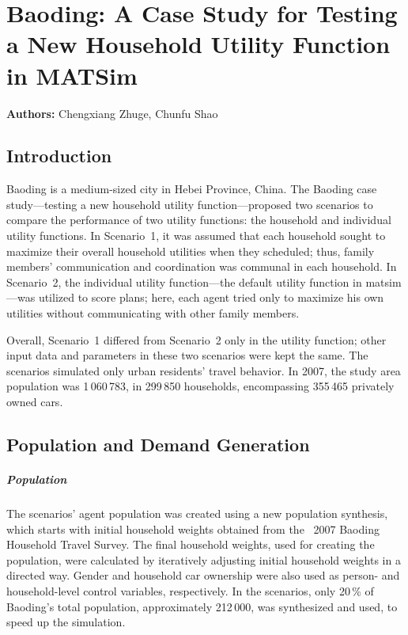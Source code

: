 \chapter{Baoding: A Case Study for Testing a New Household Utility Function in MATSim}
\label{ch:baoding}
\hfill \textbf{Authors:} Chengxiang Zhuge, Chunfu Shao



\section{Introduction}
Baoding is a medium-sized city in Hebei Province, China. 
The Baoding case study---testing a new household utility function---proposed two scenarios to compare the performance of two utility functions: the household and individual utility functions. 
In Scenario~1, it was assumed that each household sought to maximize their overall household utilities when they scheduled; thus, family members' communication and coordination was communal in each household. In Scenario~2, the individual utility function---the default utility function in \gls{matsim}---was utilized to score plans; here, each agent tried only  to maximize his own utilities without communicating with other family members. 

Overall, Scenario~1 differed from Scenario~2 only in the utility function; other input data and parameters in these two scenarios were kept the same. 
The scenarios simulated only urban residents' travel behavior. 
In 2007, the study area population was 1\,060\,783, in 299\,850 households, encompassing 355\,465 privately owned cars.  

\section{Population and Demand Generation}
\paragraph{Population} The scenarios' agent population was created using a new population synthesis, which  starts with initial household weights obtained from the ~2007 Baoding  Household Travel Survey. 
The final household weights, used for creating the population, were calculated by iteratively adjusting initial household weights in a directed way. 
Gender and household car ownership were also used as person- and household-level control variables, respectively. 
In the scenarios, only 20\,\% of Baoding's total population, approximately 212\,000, was synthesized and used, to speed up the simulation. 

